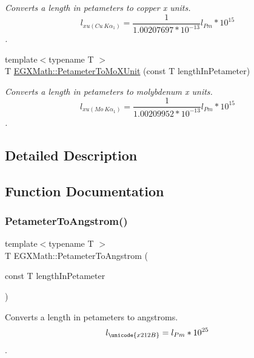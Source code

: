 \begin{DoxyCompactItemize}
\begin{DoxyCompactList}\small\item\em Converts a length in petameters to copper x units. \[ l_{xu(Cu\ K\alpha_1)}= \frac{1}{1.00207697*10^{-13}} l_{Pm} * 10^{15}\]. \end{DoxyCompactList}\item 
{\footnotesize template$<$typename T $>$ }\\T \mbox{\hyperlink{group___e_g_x_math-_conversions-_length_conversions-_petameter-_non-_s_i_ga29419ba09bb33a7bc9e23f8cde2efea3}{E\+G\+X\+Math\+::\+Petameter\+To\+Mo\+X\+Unit}} (const T length\+In\+Petameter)
\begin{DoxyCompactList}\small\item\em Converts a length in petameters to molybdenum x units. \[ l_{xu(Mo\ K\alpha_1)}=\frac{1}{1.00209952*10^{-13}} l_{Pm} * 10^{15}\]. \end{DoxyCompactList}\end{DoxyCompactItemize}


\subsection{Detailed Description}


\subsection{Function Documentation}
\mbox{\label{group___e_g_x_math-_conversions-_length_conversions-_petameter-_non-_s_i_ga2acc301b8b78a80d23a150da8cba3814}} 
\subsubsection{\texorpdfstring{Petameter\+To\+Angstrom()}{PetameterToAngstrom()}}
{\footnotesize\ttfamily template$<$typename T $>$ \\
T E\+G\+X\+Math\+::\+Petameter\+To\+Angstrom (\begin{DoxyParamCaption}\item[{const T}]{length\+In\+Petameter }\end{DoxyParamCaption})}



Converts a length in petameters to angstroms. \[ l_{\unicode{x212B}}=l_{Pm} * 10^{25} \]. 

